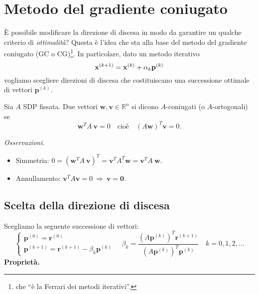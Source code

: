 \section{Metodo del gradiente coniugato}
È possibile modificare la direzione di discesa in modo da garantire un qualche criterio di \textit{ottimalità}?
Questa è l'idea che sta alla base del metodo del gradiente coniugato (GC o CG)\footnote{che ``è la Ferrari dei metodi iterativi''.}.
In particolare, dato un metodo iterativo
\begin{equation*}
\mathbf{x}^{( k+1)} =\mathbf{x}^{(k)} +\alpha _{k}\mathbf{p}^{(k)}
\end{equation*}
vogliamo scegliere direzioni di discesa che costituiscano una successione ottimale di vettori $\mathbf{p}^{(k)}$.
\begin{definition}
Sia $A$ SDP fissata.
Due vettori $\mathbf{w} ,\mathbf{v} \in \mathbb{R}^{n}$ si dicono $A$-coniugati (o $A$-ortogonali) se
\begin{equation*}
\mathbf{w}^{T} A\ \mathbf{v} =0\quad\text{cioè} \quad ( A\mathbf{w})^{T}\mathbf{v} =0.
\end{equation*}
\end{definition}
\textit{Osservazioni.}
\begin{itemize}
\item Simmetria: $0=\left(\mathbf{w}^{T} A\ \mathbf{v}\right)^{T} =\mathbf{v}^{T} A^{T}\mathbf{w} =\mathbf{v}^{T} A\ \mathbf{w}$.
\item Annullamento: $\mathbf{v}^{T} A\mathbf{v} =0\ \Rightarrow \ \mathbf{v} =\mathbf{0}$.
\end{itemize}

\subsection{Scelta della direzione di discesa}
Scegliamo la seguente successione di vettori:
\begin{equation}
\begin{cases}
\mathbf{p}^{(0)} =\mathbf{r}^{(0)}\\
\mathbf{p}^{( k+1)} =\mathbf{r}^{( k+1)} -\beta _{k}\mathbf{p}^{(k)}
\end{cases} \quad \beta _{k} =\frac{\left( A\mathbf{p}^{(k)}\right)^{T}\mathbf{r}^{( k+1)}}{\left( A\mathbf{p}^{(k)}\right)^{T}\mathbf{p}^{(k)}} \quad k=0,1,2,\dotsc
\label{eq:scelta-metodo-cg}
\end{equation}
\textbf{Proprietà.}

